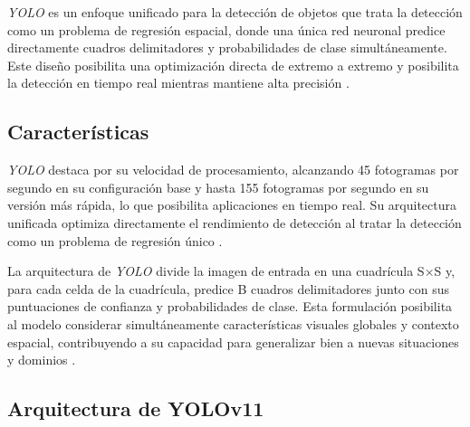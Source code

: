 \textit{YOLO} es un enfoque unificado para la detección de objetos que trata la detección como un problema de regresión espacial, donde una única red neuronal predice directamente cuadros delimitadores y probabilidades de clase simultáneamente. Este diseño posibilita una optimización directa de extremo a extremo y posibilita la detección en tiempo real mientras mantiene alta precisión \cite{yolo_paper}.

\subsection{Características}
\textit{YOLO} destaca por su velocidad de procesamiento, alcanzando 45 fotogramas por segundo en su configuración base y hasta 155 fotogramas por segundo en su versión más rápida, lo que posibilita aplicaciones en tiempo real. Su arquitectura unificada optimiza directamente el rendimiento de detección al tratar la detección como un problema de regresión único \cite{bochkovskiy2020}.

La arquitectura de \textit{YOLO} divide la imagen de entrada en una cuadrícula S×S y, para cada celda de la cuadrícula, predice B cuadros delimitadores junto con sus puntuaciones de confianza y probabilidades de clase. Esta formulación posibilita al modelo considerar simultáneamente características visuales globales y contexto espacial, contribuyendo a su capacidad para generalizar bien a nuevas situaciones y dominios \cite{yolo_docs}.

\subsection{Arquitectura de YOLOv11}

